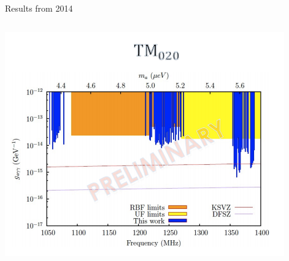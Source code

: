 \documentclass{beamer}
\begin{document}
\begin{frame}{Results from 2014}
\begin{columns}
\includegraphics[width=.95\textwidth]{2014_results_2}
\end{columns}
\end{frame}
\end{document}
